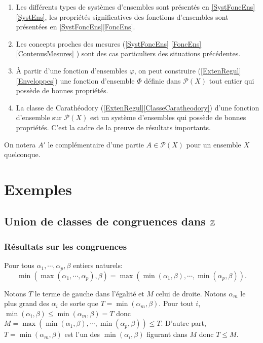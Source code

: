 \begin{enumerate}
 \item  Les différents types de systèmes d'ensembles sont présentés en \ref{SystFoncEns}\ref{SystEns}, les propriétés significatives des fonctions d'ensembles sont présentées en \ref{SystFoncEns}\ref{FoncEns}.
 \item Les concepts proches des mesures (\ref{SystFoncEns} \ref{FoncEns} \ref{ContenusMesures} ) sont des cas particuliers des situations précédentes.
 \item À partir d'une fonction d'ensembles $\varphi$, on peut construire (\ref{ExtenRegul} \ref{Enveloppes}) une fonction d'ensemble $\Phi$ définie dans $\mathcal{P}(X)$ tout entier qui possède de bonnes propriétés.
 \item La classe de Carathéodory (\ref{ExtenRegul}\ref{ClasseCaratheodory}) d'une fonction d'ensemble sur $\mathcal{P}(X)$ est un système d'ensembles qui possède de bonnes propriétés. C'est la cadre de la preuve de résultats importants.
\end{enumerate}

On notera $A'$ le complémentaire d'une partie $A \in \mathcal{P}(X)$ pour un ensemble $X$ quelconque.
\newpage

\section{Exemples}\label{Exples}
\subsection{Union de classes de congruences dans $\mathbb{Z}$} \label{ExpleZ}
\subsubsection{Résultats sur les congruences}
\begin{lem}
  Pour tous $\alpha_1, \cdots, \alpha_p, \beta$ entiers naturels:
  \begin{displaymath}
    \min \left( \max(\alpha_1, \cdots, \alpha_p) , \beta \right) = \max\left( \min(\alpha_1, \beta), \cdots , \min(\alpha_p,\beta)\right).
  \end{displaymath}
\end{lem}
\begin{demo}
  Notons $T$ le terme de gauche dans l'égalité et $M$ celui de droite. Notons $\alpha_m$ le plus grand des $\alpha_i$ de sorte que $T = \min(\alpha_m, \beta)$.\newline
  Pour tout $i$, $\min(\alpha_i, \beta) \leq \min (\alpha_m, \beta) = T$ donc $M = \max\left( \min(\alpha_1, \beta), \cdots , \min(\alpha_p,\beta)\right) \leq T$.\newline
  D'autre part, $T=\min (\alpha_m, \beta)$ est l'un des $\min(\alpha_i, \beta)$ figurant dans $M$ donc $T \leq M$.
\end{demo}

